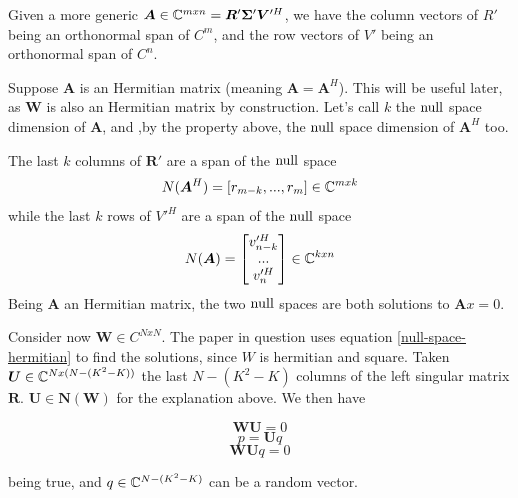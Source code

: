 Given a more generic $\bm{A} \in \mathbb{C}^{mxn} = \bm{R}'\bm{ \Sigma}' \bm{V}'^H$, we have the column vectors of $R'$ being an orthonormal span of $C^m$, and the row vectors of $V'$ being an orthonormal span of $C^n$.

Suppose $\bm{A}$ is an Hermitian matrix (meaning $\bm{A} = \bm{A}^H$). This will be useful later, as $\bm{W}$ is also an Hermitian matrix by construction. Let's call $k$ the $\operatorname{null}$ space dimension of $\bm{A}$, and ,by the property above, the $\operatorname{null}$ space dimension of $\bm{A}^H$ too.

The last $k$ columns of $\bm{R}'$ are a span of the $\operatorname{null}$ space
\begin{equation}
  N(\bm{A}^H) = [r_{m-k}, ..., r_m ] \in \mathbb{C}^{mxk}
  \label{null-space-hermitian}
\end{equation}
while the last $k$ rows of $V'^H$ are a span of the $\operatorname{null}$ space
\begin{equation}
  N(\bm{A}) = \begin{bmatrix} v'^H_{n-k} \\ ... \\ v'^H_n \end{bmatrix} \in \mathbb{C}^{kxn}
  \label{null-space-normal}
\end{equation}
Being $\bm{A}$ an Hermitian matrix, the two $\operatorname{null}$ spaces are both solutions to $\bm{A}x = 0$.

Consider now $\bm{W} \in C^{NxN}$. The paper in question uses equation \eqref{null-space-hermitian} to find the solutions, since $W$ is hermitian and square. Taken $\bm{U} \in \mathbb{C} ^ {Nx(N-(K^2 - K))}$ the last $N-(K^2 - K)$ columns of the left singular matrix $\bm{R}$. $\bm{U} \in \bm{N}(\bm{W})$ for the explanation above. We then have

\begin{equation}\bm{WU} = 0\end{equation}
\begin{equation}p = \bm{U}q\end{equation}
\begin{equation}\bm{WU}q = 0\end{equation}

being true, and $q \in \mathbb{C}^{N-(K^2 - K)}$ can be a random vector.
